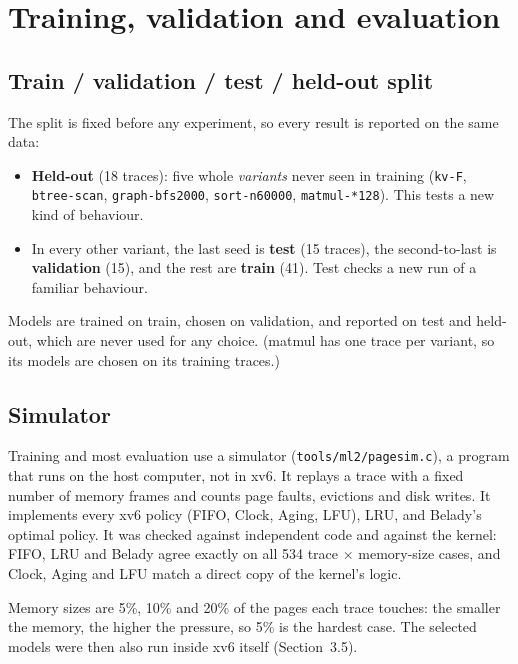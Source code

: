 \documentclass[10.5pt,a4paper]{article}
\newcommand{\code}[1]{\texttt{#1}}
\begin{document}
\section{Training, validation and evaluation}

\subsection{Train / validation / test / held-out split}

The split is fixed before any experiment, so every result is reported on the
same data:

\begin{itemize}
\item \textbf{Held-out} (18 traces): five whole \emph{variants} never seen in
training (\code{kv-F}, \code{btree-scan}, \code{graph-bfs2000},
\code{sort-n60000}, \code{matmul-*128}). This tests a new kind of behaviour.
\item In every other variant, the last seed is \textbf{test} (15 traces), the
second-to-last is \textbf{validation} (15), and the rest are \textbf{train}
(41). Test checks a new run of a familiar behaviour.
\end{itemize}

Models are trained on train, chosen on validation, and reported on test and
held-out, which are never used for any choice. (matmul has one trace per
variant, so its models are chosen on its training traces.)

\subsection{Simulator}

Training and most evaluation use a simulator (\code{tools/ml2/pagesim.c}), a
program that runs on the host computer, not in xv6. It replays a trace with a fixed number of memory frames and counts page faults,
evictions and disk writes. It implements every xv6 policy (FIFO, Clock,
Aging, LFU), LRU, and Belady's optimal policy. It was checked against
independent code and against the kernel: FIFO, LRU and Belady agree exactly
on all 534 trace $\times$ memory-size cases, and Clock, Aging and LFU match a
direct copy of the kernel's logic.

Memory sizes are 5\%, 10\% and 20\% of the pages each trace touches: the
smaller the memory, the higher the pressure, so 5\% is the hardest case. The
selected models were then also run inside xv6 itself (Section~3.5).
\end{document}
